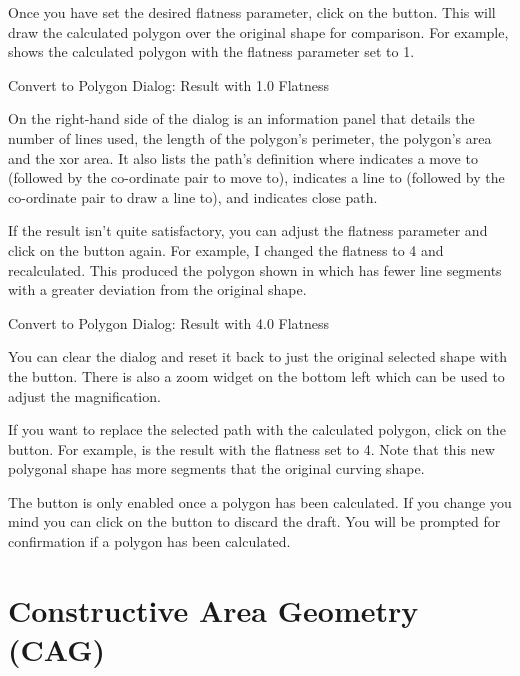 
Once you have set the desired flatness parameter, click on the
 button. This will draw the calculated
polygon over the original shape for comparison. For example, 
 shows the calculated polygon with
the flatness parameter set to 1.

{}
{Convert to Polygon Dialog: Result with 1.0 Flatness}

On the right-hand side of the  dialog is an
information panel that details the number of lines used, the length
of the polygon's perimeter, the polygon's area and the \gls{xor} area.
It also lists the path's definition where  indicates a move to
(followed by the co-ordinate pair to move to),  indicates a line to
(followed by the co-ordinate pair to draw a line to), and 
indicates close path.

If the result isn't quite satisfactory, you can adjust the flatness
parameter and click on the  button again.
For example, I changed the flatness to 4 and recalculated. This
produced the polygon shown in  which
has fewer line segments with a greater deviation from the original
shape.

{}
{Convert to Polygon Dialog: Result with 4.0 Flatness}


You can clear the dialog and reset it back to just the original
selected shape with the  button.
There is also a zoom widget on the bottom left which can be used to
adjust the magnification.

If you want to replace the selected path with the
calculated polygon, click on the  button.  For example,
 is the result with the flatness set
to 4. Note that this new polygonal shape has more segments that the 
original curving shape.

\begin{information}
The  button is only enabled once a polygon has been
calculated. If you change you mind you can click on the 
button to discard the draft. You will be prompted for confirmation
if a polygon has been calculated.
\end{information}


\section{Constructive Area Geometry (CAG)}\label{sec:cag}

